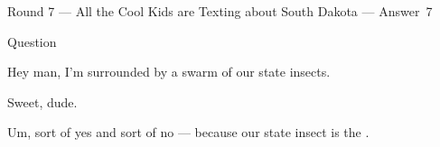 \documentclass[11pt]{beamer}
\begin{document}
\begin{frame}[t]{Round 7 --- All the Cool Kids are Texting about South Dakota --- \mbox{Answer 7}}
\begin{block}{Question}

\begin{minipage}{0.9\textwidth}
\begin{mdframed}[
    roundcorner=7pt,
    backgroundcolor=black!5,
    linecolor=black!5,
    fontcolor=black,
    ignorelastdescenders]
\begin{flushleft}
{\small{}\selectfont{}
Hey man, I'm surrounded by a swarm of our state insects.
}
\end{flushleft}
\end{mdframed}
\end{minipage}

\hfill{}\begin{minipage}{0.9\textwidth}
\begin{mdframed}[
    roundcorner=7pt,
    backgroundcolor=blue!80!white,
    linecolor=blue!80!white,
    fontcolor=white,
    ignorelastdescenders]
\begin{flushleft}
{\small{}\selectfont{}
Sweet, dude.
}
\end{flushleft}
\end{mdframed}
\end{minipage}

\begin{minipage}{0.9\textwidth}
\begin{mdframed}[
    roundcorner=7pt,
    backgroundcolor=black!5,
    linecolor=black!5,
    fontcolor=black,
    ignorelastdescenders]
\begin{flushleft}
{\small{}\selectfont{}
Um, sort of yes and sort of no --- because our state insect is the \textunderscore{}\textunderscore{}\textunderscore{}\textunderscore{}\textunderscore{}\textunderscore{} \textunderscore{}\textunderscore{}\textunderscore{}\textunderscore{}\textunderscore{}\textunderscore{}.
}
\end{flushleft}
\end{mdframed}
\end{minipage}
\end{block}
\end{frame}
\end{document}
